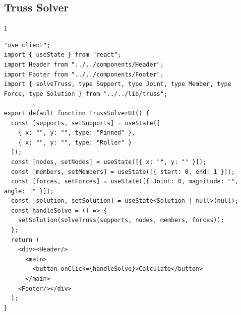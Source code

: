 \subsection*{Truss Solver}
\begin{spacing}{1}
\begin{Verbatim}[breaklines=true, breaksymbolleft={}, breaksymbolright={}]
"use client";
import { useState } from "react";
import Header from "../../components/Header";
import Footer from "../../components/Footer";
import { solveTruss, type Support, type Joint, type Member, type Force, type Solution } from "../../lib/truss";

export default function TrussSolverUI() {
  const [supports, setSupports] = useState([
    { x: "", y: "", type: "Pinned" },
    { x: "", y: "", type: "Roller" }
  ]);
  const [nodes, setNodes] = useState([{ x: "", y: "" }]);
  const [members, setMembers] = useState([{ start: 0, end: 1 }]);
  const [forces, setForces] = useState([{ Joint: 0, magnitude: "", angle: "" }]);
  const [solution, setSolution] = useState<Solution | null>(null);
  const handleSolve = () => {
    setSolution(solveTruss(supports, nodes, members, forces));
  };
  return (
    <div><Header/>
      <main>
        <button onClick={handleSolve}>Calculate</button>
      </main>
    <Footer/></div>
  );
}
\end{Verbatim}
\end{spacing}

